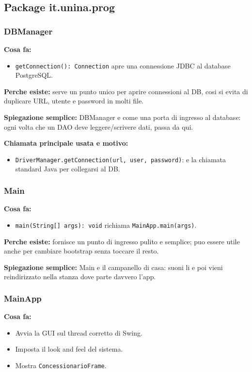 \documentclass[12pt,a4paper]{article}
\begin{document}
\subsection{Package it.unina.prog}

\subsubsection*{DBManager}
\textbf{Cosa fa:}
\begin{itemize}
  \item \texttt{getConnection(): Connection} apre una connessione JDBC al database PostgreSQL.
\end{itemize}

\textbf{Perche esiste:}
serve un punto unico per aprire connessioni al DB, cosi si evita di duplicare URL, utente e password in molti file.

\textbf{Spiegazione semplice:}
DBManager e come una porta di ingresso al database: ogni volta che un DAO deve leggere/scrivere dati, passa da qui.

\textbf{Chiamata principale usata e motivo:}
\begin{itemize}
  \item \texttt{DriverManager.getConnection(url, user, password)}: e la chiamata standard Java per collegarsi al DB.
\end{itemize}

\subsubsection*{Main}
\textbf{Cosa fa:}
\begin{itemize}
  \item \texttt{main(String[] args): void} richiama \texttt{MainApp.main(args)}.
\end{itemize}

\textbf{Perche esiste:}
fornisce un punto di ingresso pulito e semplice; puo essere utile anche per cambiare bootstrap senza toccare il resto.

\textbf{Spiegazione semplice:}
Main e il campanello di casa: suoni li e poi vieni reindirizzato nella stanza dove parte davvero l'app.

\subsubsection*{MainApp}
\textbf{Cosa fa:}
\begin{itemize}
  \item Avvia la GUI sul thread corretto di Swing.
  \item Imposta il look and feel del sistema.
  \item Mostra \texttt{ConcessionarioFrame}.
\end{itemize}
\end{document}
